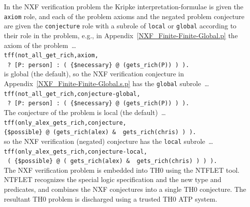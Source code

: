 \documentclass{easychair}
\newcommand{\smalltt}[1]{\small \texttt{#1}}
\begin{document}
In the NXF verification problem the Kripke interpretation-formulae is given the {\tt axiom} role,
and each of the problem axioms and the negated problem conjecture are given the {\tt conjecture} 
role with a subrole of {\tt local} or {\tt global} according to their role in the problem, e.g., 
in Appendix~\ref{NXF_Finite-Finite-Global.p} the axiom of the problem~\ldots \\
\hspace*{0.5cm}\smalltt{tff(not\_all\_get\_rich,axiom,} \\
\hspace*{0.8cm}\smalltt{{\raisebox{0.4ex}{\texttildelow}}\,?\,[P:\,person]\,:\,(\,\{\$necessary\}\,@\,(gets\_rich(P))\,)\,).}\\
is global (the default), so the NXF verification conjecture in 
Appendix~\ref{NXF_Finite-Finite-Global.s.p} has the {\tt global} subrole~\ldots \\
\hspace*{0.5cm}\smalltt{tff(not\_all\_get\_rich,conjecture-global,} \\
\hspace*{0.8cm}\smalltt{{\raisebox{0.4ex}{\texttildelow}}\,?\,[P:\,person]\,:\,(\,\{\$necessary\}\,@\,(gets\_rich(P))\,)\,).} \\
The conjecture of the problem is local (the default)~\ldots \\
\hspace*{0.5cm}\smalltt{tff(only\_alex\_gets\_rich,conjecture,} \\
\hspace*{0.8cm}\smalltt{\{\$possible\}\,@\,(gets\_rich(alex)\,\&\,{\raisebox{0.4ex}{\texttildelow}}\,gets\_rich(chris)\,)\,).} \\
so the NXF verification (negated) conjecture has the {\tt local} subrole~\ldots \\
\hspace*{0.5cm}\smalltt{tff(only\_alex\_gets\_rich,conjecture-local,} \\
\hspace*{0.8cm}\smalltt{{\raisebox{0.4ex}{\texttildelow}}\,(\,\{\$possible\}\,@\,(\,gets\_rich(alex)\,\&\,{\raisebox{0.4ex}{\texttildelow}}\,gets\_rich(chris)\,)\,)\,).} \\

The NXF verification problem is embedded into TH0 using the NTFLET tool.
NTFLET recognizes the special logic specification and the new type and predicates, and combines
the NXF conjectures into a single TH0 conjecture.
The resultant TH0 problem is discharged using a trusted TH0 ATP system.
\end{document}
